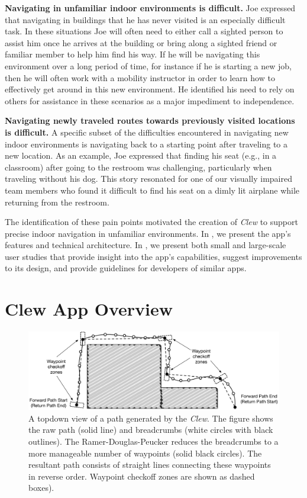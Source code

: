 \documentclass[chi_draft]{sigchi}
\begin{document}
\textbf{Navigating in unfamiliar indoor environments is difficult.} Joe expressed that navigating in buildings that he has never visited is an especially difficult task.  In these situations Joe will often need to either call a sighted person to assist him once he arrives at the building or bring along a sighted friend or familiar member to help him find his way.  If he will be navigating this environment over a long period of time, for instance if he is starting a new job, then he will often work with a mobility instructor in order to learn how to effectively get around in this new environment.  He identified his need to rely on others for assistance in these scenarios as a major impediment to independence.

\textbf{Navigating newly traveled routes towards previously visited locations is difficult.} A specific subset of the difficulties encountered in navigating new indoor environments is navigating back to a starting point after traveling to a new location.  As an example, Joe expressed that finding his seat (e.g., in a classroom) after going to the restroom was challenging, particularly when traveling without his dog. This story resonated for one of our visually impaired team members who found it difficult to find his seat on a dimly lit airplane while returning from the restroom.

The identification of these pain points motivated the creation of \emph{Clew} to support precise indoor navigation in unfamiliar environments.  In \emph{}, we present the app's features and technical architecture.  In \emph{}, we present both small and large-scale user studies that provide insight into the app's capabilities, suggest improvements to its design, and provide guidelines for developers of similar apps.

\section{Clew App Overview}\label{sec:clewoverview}

\begin{figure}
\begin{center}
\includegraphics[width=\linewidth]{Figures/samplepath}
\end{center}
\caption{A topdown view of a path generated by the \emph{Clew}.  The figure shows the raw path (solid line) and breadcrumbs (white circles with black outlines).  The Ramer-Douglas-Peucker reduces the breadcrumbs to a more manageable number of waypoints (solid black circles).  The resultant path consists of straight lines connecting these waypoints in reverse order.  Waypoint checkoff zones are shown as dashed boxes).\label{fig:samplepath}}
\end{figure}
\end{document}
